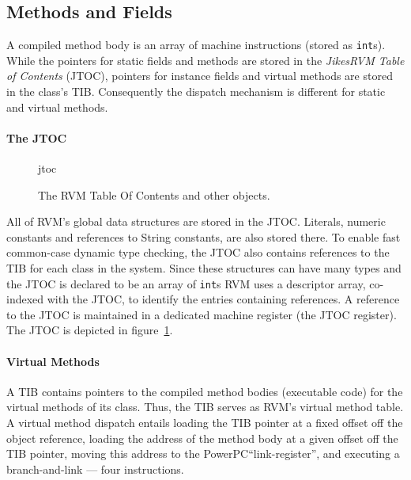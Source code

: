 \subsection{Methods and Fields}\label{sssec:methods}
A compiled method body is an array of machine instructions (stored as
{\tt int}s). 
While the pointers for static fields and methods are stored in the 
{\em JikesRVM Table of Contents} (JTOC),
pointers for instance fields and virtual methods are stored in the class's TIB.
Consequently the dispatch mechanism is different for static and virtual 
methods.

\paragraph{The JTOC}
\begin{figure}[htb]
\begin{gif}{jtoc}
\vbox{
\hbox{}
}\hfil
\end{gif}
\caption{The RVM Table Of Contents and other objects.}
\label{fig:jtoc}
\end{figure}
All of RVM's global data structures are stored in the JTOC. 
Literals, numeric
constants and references to String constants, are also stored there.
To enable fast common-case dynamic type checking, the JTOC also
contains references to the TIB for each class in the system.  
Since these 
structures can have many types and the JTOC is declared to be an array of 
{\tt int}s  
RVM uses a descriptor array, co-indexed with the JTOC, 
to identify the entries containing references.
A reference to the JTOC is maintained in a dedicated machine register 
(the JTOC register).
The JTOC
is depicted in figure~\ref{fig:jtoc}.  

\paragraph{Virtual Methods}
A TIB contains pointers to the compiled method 
bodies (executable code) for the virtual methods of its class. 
Thus, the TIB serves as RVM's virtual method table.
A
virtual method dispatch entails loading the TIB pointer at a fixed
offset off the object reference, loading the address of the method
body at a given offset off the TIB pointer, moving this address to the
PowerPC\PowerPCTMFootnote ``link-register'', and executing a
branch-and-link --- four 
instructions.

